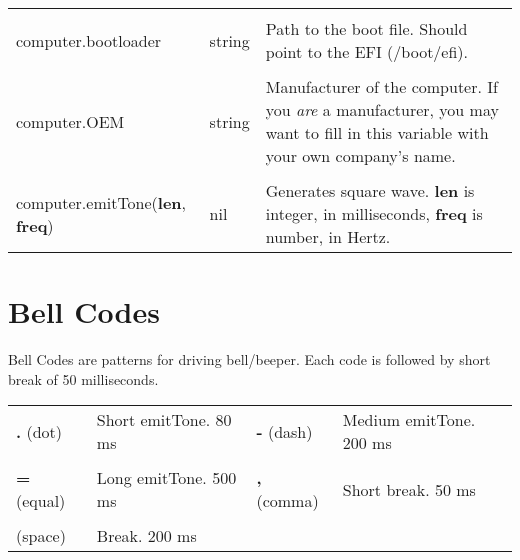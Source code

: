 \begin{tabularx}{\textwidth}{l l X}
	\\ \\
	computer.bootloader & string & Path to the boot file. Should point to the EFI (/boot/efi).
	\\ \\
	computer.OEM & string & Manufacturer of the computer. If you \emph{are} a manufacturer, you may want to fill in this variable with your own company's name.
	\\ \\
	computer.emitTone(\textbf{len}, \textbf{freq}) & nil & Generates square wave. \textbf{len} is integer, in milliseconds, \textbf{freq} is number, in Hertz.
\end{tabularx}

\section{Bell Codes}

Bell Codes are patterns for driving bell/beeper. Each code is followed by short break of 50 milliseconds.

\begin{tabularx}{\textwidth}{l X l X}
	\textbf{.} (dot) & Short emitTone. 80 ms & \textbf{-} (dash) & Medium emitTone. 200 ms
	\\ \\
	\textbf{=} (equal) & Long emitTone. 500 ms & \textbf{,} (comma) & Short break. 50 ms
	\\ \\
	(space) & Break. 200 ms
\end{tabularx}